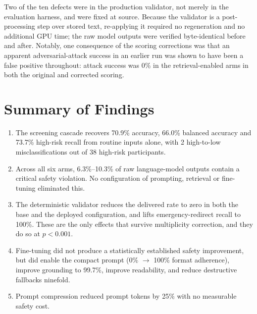 Two of the ten defects were in the production validator, not merely in the
evaluation harness, and were fixed at source. Because the validator is a
post-processing step over stored text, re-applying it required no regeneration
and no additional GPU time; the raw model outputs were verified byte-identical
before and after. Notably, one consequence of the scoring corrections was that
an apparent adversarial-attack success in an earlier run was shown to have been
a false positive throughout: attack success was 0\% in the retrieval-enabled
arms in both the original and corrected scoring.

\section{Summary of Findings}
\label{sec:results_summary}

\begin{enumerate}
  \item The screening cascade recovers 70.9\% accuracy, 66.0\% balanced accuracy
        and 73.7\% high-risk recall from routine inputs alone, with 2 high-to-low
        misclassifications out of 38 high-risk participants.
  \item Across all six arms, 6.3\%--10.3\% of raw language-model outputs contain a
        critical safety violation. No configuration of prompting, retrieval or
        fine-tuning eliminated this.
  \item The deterministic validator reduces the delivered rate to zero in both
        the base and the deployed configuration, and lifts emergency-redirect
        recall to 100\%. These are the only effects that survive multiplicity
        correction, and they do so at $p<0.001$.
  \item Fine-tuning did not produce a statistically established safety
        improvement, but did enable the compact prompt (0\% $\rightarrow$ 100\%
        format adherence), improve grounding to 99.7\%, improve readability, and
        reduce destructive fallbacks ninefold.
  \item Prompt compression reduced prompt tokens by 25\% with no measurable
        safety cost.
\end{enumerate}
